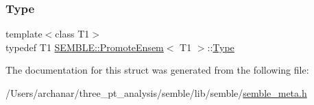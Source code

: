\subsubsection{\texorpdfstring{Type}{Type}\hspace{0.1cm}{\footnotesize\ttfamily [2/2]}}
{\footnotesize\ttfamily template$<$class T1$>$ \\
typedef T1 \mbox{\hyperlink{structSEMBLE_1_1PromoteEnsem}{S\+E\+M\+B\+L\+E\+::\+Promote\+Ensem}}$<$ T1 $>$\+::\mbox{\hyperlink{structSEMBLE_1_1PromoteEnsem_a14f38c8aa1755d1201dd126a233e32a8}{Type}}}



The documentation for this struct was generated from the following file\+:\begin{DoxyCompactItemize}
\item 
/\+Users/archanar/three\+\_\+pt\+\_\+analysis/semble/lib/semble/\mbox{\hyperlink{lib_2semble_2semble__meta_8h}{semble\+\_\+meta.\+h}}\end{DoxyCompactItemize}
